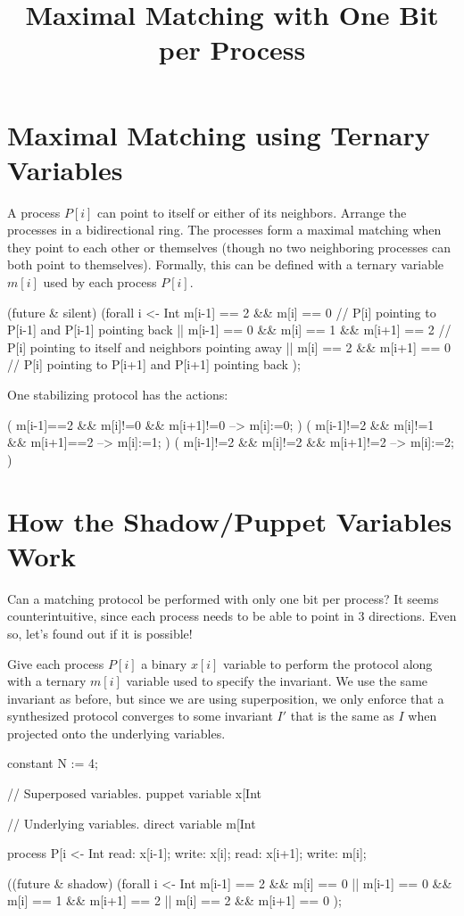 
\title{Maximal Matching with One Bit per Process}
\date{}



\section{Maximal Matching using Ternary Variables}

A process $P[i]$ can point to itself or either of its neighbors.
Arrange the processes in a bidirectional ring.
The processes form a maximal matching when they point to each other or themselves (though no two neighboring processes can both point to themselves).
Formally, this can be defined with a ternary variable $m[i]$ used by each process $P[i]$.
\begin{code}
(future & silent)
  (forall i <- Int %
      m[i-1] == 2 && m[i] == 0                 // P[i] pointing to P[i-1] and P[i-1] pointing back
   || m[i-1] == 0 && m[i] == 1 && m[i+1] == 2  // P[i] pointing to itself and neighbors pointing away
   ||                m[i] == 2 && m[i+1] == 0  // P[i] pointing to P[i+1] and P[i+1] pointing back
  );
\end{code}

One stabilizing protocol has the actions:
\begin{code}
( m[i-1]==2 && m[i]!=0 && m[i+1]!=0 --> m[i]:=0; )
( m[i-1]!=2 && m[i]!=1 && m[i+1]==2 --> m[i]:=1; )
( m[i-1]!=2 && m[i]!=2 && m[i+1]!=2 --> m[i]:=2; )
\end{code}

\section{How the Shadow/Puppet Variables Work}

Can a matching protocol be performed with only one bit per process?
It seems counterintuitive, since each process needs to be able to point in $3$ directions.
Even so, let's found out if it is possible!

Give each process $P[i]$ a binary $x[i]$ variable to perform the protocol along with a ternary $m[i]$ variable used to specify the invariant.
We use the same invariant as before, but since we are using superposition, we only enforce that a synthesized protocol converges to some invariant $I'$ that is the same as $I$ when projected onto the underlying variables.
\begin{code}
constant N := 4;

// Superposed variables.
puppet variable x[Int %

// Underlying variables.
direct variable m[Int %

process P[i <- Int %
{
  read: x[i-1];
  write: x[i];
  read: x[i+1];
  write: m[i];
}

((future & shadow) %
  (forall i <- Int %
      m[i-1] == 2 && m[i] == 0
   || m[i-1] == 0 && m[i] == 1 && m[i+1] == 2
   ||                m[i] == 2 && m[i+1] == 0
  );
\end{code}

